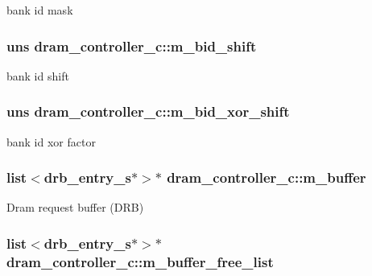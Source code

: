 \label{classdram__controller__c_a433a0c33c4b2075c99ac4f7d489ec66b}
bank id mask \hypertarget{classdram__controller__c_ab181fe193cffbadab11d1c2252f071d9}{
\subsubsection[{m\_\-bid\_\-shift}]{\setlength{\rightskip}{0pt plus 5cm}uns {\bf dram\_\-controller\_\-c::m\_\-bid\_\-shift}}}
\label{classdram__controller__c_ab181fe193cffbadab11d1c2252f071d9}
bank id shift \hypertarget{classdram__controller__c_aa31c9a4e62e699e26dab2bc03487f71e}{
\subsubsection[{m\_\-bid\_\-xor\_\-shift}]{\setlength{\rightskip}{0pt plus 5cm}uns {\bf dram\_\-controller\_\-c::m\_\-bid\_\-xor\_\-shift}}}
\label{classdram__controller__c_aa31c9a4e62e699e26dab2bc03487f71e}
bank id xor factor \hypertarget{classdram__controller__c_ae827da2c640a345b548f55c4619df6c3}{
\subsubsection[{m\_\-buffer}]{\setlength{\rightskip}{0pt plus 5cm}list$<${\bf drb\_\-entry\_\-s}$\ast$$>$$\ast$ {\bf dram\_\-controller\_\-c::m\_\-buffer}}}
\label{classdram__controller__c_ae827da2c640a345b548f55c4619df6c3}
Dram request buffer (DRB) \hypertarget{classdram__controller__c_a62d96cc25786a499d89ae5d17732e532}{
\subsubsection[{m\_\-buffer\_\-free\_\-list}]{\setlength{\rightskip}{0pt plus 5cm}list$<${\bf drb\_\-entry\_\-s}$\ast$$>$$\ast$ {\bf dram\_\-controller\_\-c::m\_\-buffer\_\-free\_\-list}}}
